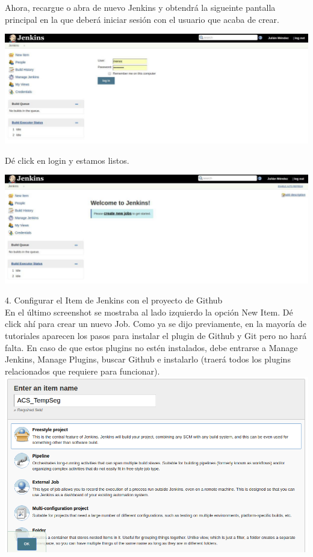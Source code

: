 \documentclass[a4paper]{article}
\begin{document}
{Ahora, recargue o abra de nuevo Jenkins y obtendrá la sigueinte pantalla principal en la que deberá iniciar sesión con el usuario que acaba de crear. 

\centering
	\includegraphics[scale=0.5]{maainjenkins}
\justify

Dé click en login y estamos listos. 


\centering
	\includegraphics[scale=0.5]{jenkinsaskjob}
\justify

\newpage

4. Configurar el Item de Jenkins con el proyecto de Github\\

	En el último screenshot se mostraba al lado izquierdo la opción New Item. Dé click ahí para crear un nuevo Job. Como ya se dijo previamente, en la mayoría de tutoriales aparecen los pasos para instalar el plugin de Github y Git pero no hará falta. En caso de que estos plugins no estén instalados, debe entrarse a Manage Jenkins, Manage Plugins, buscar Github e instalarlo (traerá todos los plugins relacionados que requiere para funcionar). \\

\centering
	\includegraphics[scale=0.4]{newitem}
\justify

}
\end{document}
